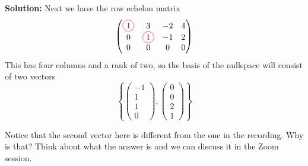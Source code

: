 \documentclass[reqno]{amsart}
\theoremstyle{definition}
\begin{document}
\begin{enumerate}
\textbf{Solution:  }
Next we have the row echelon matrix
%
\begin{equation*}
\begin{pmatrix}
\circled{1} & 3 & -2 & 4\\
0 & \circled{1} & -1 & 2\\
0 & 0 & 0 & 0
\end{pmatrix}
\end{equation*}
%
This has four columns and a rank of two, so the basis of the nullspace will consist of two vectors
%
\begin{equation*}
\left\lbrace \begin{pmatrix}
-1\\
1\\
1\\
0
\end{pmatrix}, \begin{pmatrix}
0\\
0\\
2\\
1
\end{pmatrix}\right\rbrace
\end{equation*}

Notice that the second vector here is different from the one in the recording.  Why is that?
Think about what the answer is and we can discuss it in the Zoom session.

\end{enumerate}
\end{document}
